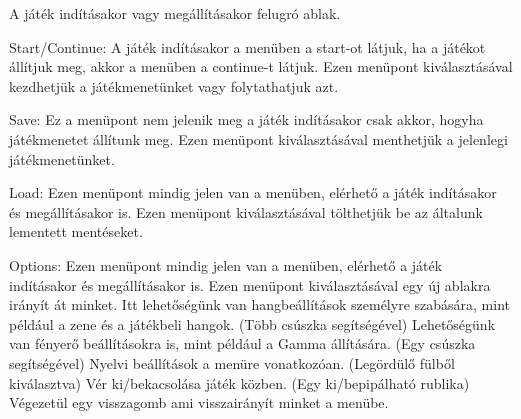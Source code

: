 \iffalse
A fejezet tartalma témától függően változhat. Az alábbiakat attól függően különböző arányban tartalmazhatják.
\begin{itemize}
\item Irodalomkutatás. Amennyiben a dolgozat egy módszer kidolgozására, kifejlesztésére irányul, akkor itt lehet részletesen végignézni (módszertani vagy időrendi bontásban), hogy az eddigiekben milyen eredmények születtek a témakörben.
\item Technológia. Mivel jellemzően kutatásról vagy szoftverfejlesztésről van szó, ezért annak a jellemző elemeit, technikai részleteit itt kell bemutatni.
Ez tehát egy módszeres bevezetés ahhoz, hogy ha valaki nem jártas a témakörben, akkor tudja, hogy a dolgozat milyen aktuálisan elérhető eredményeket, eszközöket használt fel.
\item Piackutatás. Bizonyos témáknál új termék vagy szolgáltatás kifejlesztése a cél.
Ekkor érdemes annak alaposan utánanézni, hogy aktuálisan milyen eszközök érhetők el a piacon.
Ez szoftverek esetében a hasonló alkalmazások bemutatását, táblázatos formában történő összehasonlítását jelentheti.
Szerepelhetnek képek és észrevételek a viszonyításként bemutatott alkalmazásokhoz.
\item Követelmény specifikáció. Külön szakaszban érdemes részletesen kitérni az elkészítendő alkalmazással kapcsolatos követelményekre.
Ehhez tartozhatnak forgatókönyvek (\textit{scenario}-k).
A szemléletesség kedvéért lehet hozzájuk képernyőkép vázlatokat is készíteni, vagy a használati eseteket más módon szemléltetni.
\end{itemize}
\fi


A játék indításakor vagy megállításakor felugró ablak.

Start/Continue:
A játék indításakor a menüben a start-ot látjuk, ha a játékot állítjuk meg, akkor a menüben a continue-t látjuk.
Ezen menüpont kiválasztásával kezdhetjük a játékmenetünket vagy folytathatjuk azt.

Save:
Ez a menüpont nem jelenik meg a játék indításakor csak akkor, hogyha játékmenetet állítunk meg.
Ezen menüpont kiválasztásával menthetjük a jelenlegi játékmenetünket.

Load:
Ezen menüpont mindig jelen van a menüben, elérhető a játék indításakor és megállításakor is.
Ezen menüpont kiválasztásával tölthetjük be az általunk lementett mentéseket.

Options:
Ezen menüpont mindig jelen van a menüben, elérhető a játék indításakor és megállításakor is.
Ezen menüpont kiválasztásával egy új ablakra irányít át minket.
Itt lehetőségünk van hangbeállítások személyre szabására, mint például a zene és a játékbeli hangok. (Több csúszka segítségével)
Lehetőségünk van fényerő beállításokra is, mint például a Gamma állítására. (Egy csúszka segítségével)
Nyelvi beállítások a menüre vonatkozóan. (Legördülő fülből kiválasztva)
Vér ki/bekacsolása játék közben. (Egy ki/bepipálható rublika)
Végezetül egy visszagomb ami visszairányít minket a menübe.


